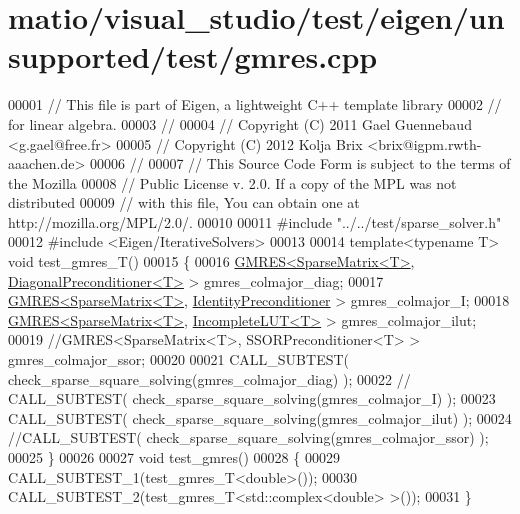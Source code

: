 \hypertarget{matio_2visual__studio_2test_2eigen_2unsupported_2test_2gmres_8cpp_source}{}\section{matio/visual\+\_\+studio/test/eigen/unsupported/test/gmres.cpp}
\label{matio_2visual__studio_2test_2eigen_2unsupported_2test_2gmres_8cpp_source}

\begin{DoxyCode}
00001 \textcolor{comment}{// This file is part of Eigen, a lightweight C++ template library}
00002 \textcolor{comment}{// for linear algebra.}
00003 \textcolor{comment}{//}
00004 \textcolor{comment}{// Copyright (C) 2011 Gael Guennebaud <g.gael@free.fr>}
00005 \textcolor{comment}{// Copyright (C) 2012 Kolja Brix <brix@igpm.rwth-aaachen.de>}
00006 \textcolor{comment}{//}
00007 \textcolor{comment}{// This Source Code Form is subject to the terms of the Mozilla}
00008 \textcolor{comment}{// Public License v. 2.0. If a copy of the MPL was not distributed}
00009 \textcolor{comment}{// with this file, You can obtain one at http://mozilla.org/MPL/2.0/.}
00010 
00011 \textcolor{preprocessor}{#include "../../test/sparse\_solver.h"}
00012 \textcolor{preprocessor}{#include <Eigen/IterativeSolvers>}
00013 
00014 \textcolor{keyword}{template}<\textcolor{keyword}{typename} T> \textcolor{keywordtype}{void} test\_gmres\_T()
00015 \{
00016   \hyperlink{group___iterative_linear_solvers___module_class_eigen_1_1_g_m_r_e_s}{GMRES<SparseMatrix<T>}, \hyperlink{group___iterative_linear_solvers___module_class_eigen_1_1_diagonal_preconditioner}{DiagonalPreconditioner<T>} > 
      gmres\_colmajor\_diag;
00017   \hyperlink{group___iterative_linear_solvers___module_class_eigen_1_1_g_m_r_e_s}{GMRES<SparseMatrix<T>}, \hyperlink{group___iterative_linear_solvers___module_class_eigen_1_1_identity_preconditioner}{IdentityPreconditioner}    > 
      gmres\_colmajor\_I;
00018   \hyperlink{group___iterative_linear_solvers___module_class_eigen_1_1_g_m_r_e_s}{GMRES<SparseMatrix<T>}, \hyperlink{group___iterative_linear_solvers___module_class_eigen_1_1_incomplete_l_u_t}{IncompleteLUT<T>} >           
      gmres\_colmajor\_ilut;
00019   \textcolor{comment}{//GMRES<SparseMatrix<T>, SSORPreconditioner<T> >     gmres\_colmajor\_ssor;}
00020 
00021   CALL\_SUBTEST( check\_sparse\_square\_solving(gmres\_colmajor\_diag)  );
00022 \textcolor{comment}{//   CALL\_SUBTEST( check\_sparse\_square\_solving(gmres\_colmajor\_I)     );}
00023   CALL\_SUBTEST( check\_sparse\_square\_solving(gmres\_colmajor\_ilut)     );
00024   \textcolor{comment}{//CALL\_SUBTEST( check\_sparse\_square\_solving(gmres\_colmajor\_ssor)     );}
00025 \}
00026 
00027 \textcolor{keywordtype}{void} test\_gmres()
00028 \{
00029   CALL\_SUBTEST\_1(test\_gmres\_T<double>());
00030   CALL\_SUBTEST\_2(test\_gmres\_T<std::complex<double> >());
00031 \}
\end{DoxyCode}
